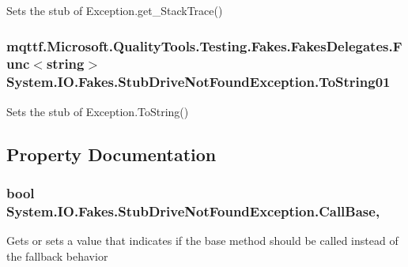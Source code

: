 Sets the stub of Exception.\-get\-\_\-\-Stack\-Trace()

\hypertarget{class_system_1_1_i_o_1_1_fakes_1_1_stub_drive_not_found_exception_ab4598423c095010e73b8048e9256ee92}{
\subsubsection[{To\-String01}]{\setlength{\rightskip}{0pt plus 5cm}mqttf.\-Microsoft.\-Quality\-Tools.\-Testing.\-Fakes.\-Fakes\-Delegates.\-Func$<$string$>$ System.\-I\-O.\-Fakes.\-Stub\-Drive\-Not\-Found\-Exception.\-To\-String01}}\label{class_system_1_1_i_o_1_1_fakes_1_1_stub_drive_not_found_exception_ab4598423c095010e73b8048e9256ee92}


Sets the stub of Exception.\-To\-String()



\subsection{Property Documentation}
\hypertarget{class_system_1_1_i_o_1_1_fakes_1_1_stub_drive_not_found_exception_a2361f8545f3fc7fdbb430f0e7bfbc9e4}{
\subsubsection[{Call\-Base}]{\setlength{\rightskip}{0pt plus 5cm}bool System.\-I\-O.\-Fakes.\-Stub\-Drive\-Not\-Found\-Exception.\-Call\-Base\hspace{0.3cm}{\ttfamily [get]}, {\ttfamily [set]}}}\label{class_system_1_1_i_o_1_1_fakes_1_1_stub_drive_not_found_exception_a2361f8545f3fc7fdbb430f0e7bfbc9e4}


Gets or sets a value that indicates if the base method should be called instead of the fallback behavior

